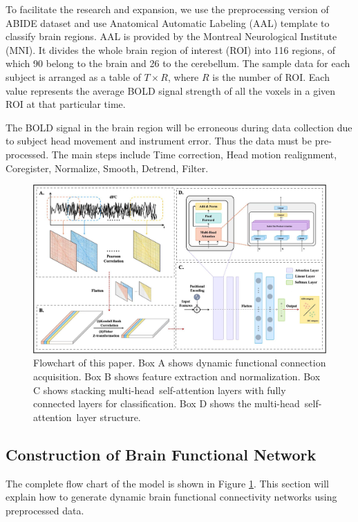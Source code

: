 \documentclass[a4paper]{cas-dc}
\begin{document}
To facilitate the research and expansion, we use the preprocessing version of ABIDE dataset and use Anatomical Automatic Labeling (AAL) template to classify brain regions. AAL is provided by the Montreal Neurological Institute (MNI). It divides the whole brain region of interest (ROI) into 116 regions, of which 90 belong to the brain and 26 to the cerebellum. The sample data for each subject is arranged as a table of $T\times R$, where $R$ is the number of ROI. Each value represents the average BOLD signal strength of all the voxels in a given ROI at that particular time.

The BOLD signal in the brain region will be erroneous during data collection due to subject head movement and instrument error. Thus the data must be pre-processed. The main steps include Time correction, Head motion realignment, Coregister, Normalize, Smooth, Detrend, Filter.

\begin{figure}[t]
	\centering
	\label{Fig1}
	\includegraphics[width=\textwidth]{model.jpg}
	\caption{Flowchart of this paper. Box A shows dynamic functional connection acquisition. Box B shows feature extraction and normalization. Box C shows stacking multi-head self-attention layers with fully connected layers for classification. Box D shows the multi-head self-attention layer structure.}
\end{figure} 

\subsection{Construction of Brain Functional Network}
The complete flow chart of the model is shown in Figure \ref{Fig1}. This section will explain how to generate dynamic brain functional connectivity networks using preprocessed data. 
\end{document}
